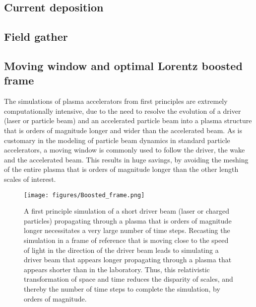 \documentclass[]{report}
\begin{document}
\subsection{Current deposition}



\subsection{Field gather}



\subsection{Moving window and optimal Lorentz boosted frame}
The simulations of plasma accelerators from first principles are extremely computationally intensive, due to the need to resolve the evolution of a driver (laser or particle beam) and an accelerated particle beam into a plasma structure that is orders of magnitude longer and wider than the accelerated beam. As is customary in the modeling of particle beam dynamics in standard particle accelerators, a moving window is commonly used to follow the driver, the wake and the accelerated beam. This results in huge savings, by avoiding the meshing of the entire plasma that is orders of magnitude longer than the other length scales of interest. 

\begin{figure}
\texttt{[image: figures/Boosted\_frame.png]}
\caption{\label{fig:PIC} A first principle simulation of a short driver beam (laser or charged particles) propagating through a plasma that is orders of magnitude longer necessitates a very large number of time steps. Recasting the simulation in a frame of reference that is moving close to the speed of light in the direction of the driver beam leads to simulating a driver beam that appears longer propagating through a plasma that appears shorter than in the laboratory. Thus, this relativistic transformation of space and time reduces the disparity of scales, and thereby the number of time steps to complete the simulation, by orders of magnitude.}
\end{figure}
\end{document}
